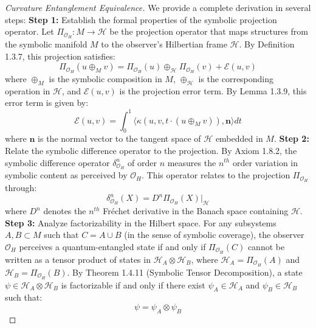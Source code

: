 \begin{proof}[Curvature Entanglement Equivalence]
\label{proof:bk8_curvature_entanglement_equivalence}
We provide a complete derivation in several steps:
\textbf{Step 1:} Establish the formal properties of the symbolic projection operator.
Let $\Pi_{\mathcal{O}_H}: M \to \mathcal{H}$ be the projection operator that maps structures from the symbolic manifold $M$ to the observer's Hilbertian frame $\mathcal{H}$. By Definition 1.3.7, this projection satisfies:
\begin{equation}
\Pi_{\mathcal{O}_H}(u \oplus_M v) = \Pi_{\mathcal{O}_H}(u) \oplus_{\mathcal{H}} \Pi_{\mathcal{O}_H}(v) + \mathcal{E}(u,v)
\end{equation}
where $\oplus_M$ is the symbolic composition in $M$, $\oplus_{\mathcal{H}}$ is the corresponding operation in $\mathcal{H}$, and $\mathcal{E}(u,v)$ is the projection error term. By Lemma 1.3.9, this error term is given by:
\begin{equation}
\mathcal{E}(u,v) = \int_{0}^{1} \langle \kappa(u,v,t\cdot(u \oplus_M v)), \mathbf{n} \rangle dt
\end{equation}
where $\mathbf{n}$ is the normal vector to the tangent space of $\mathcal{H}$ embedded in $M$.
\textbf{Step 2:} Relate the symbolic difference operator to the projection.
By Axiom 1.8.2, the symbolic difference operator $\delta^n_{\mathcal{O}_H}$ of order $n$ measures the $n^{th}$ order variation in symbolic content as perceived by $\mathcal{O}_H$. This operator relates to the projection $\Pi_{\mathcal{O}_H}$ through:
\begin{equation}
\delta^n_{\mathcal{O}_H}(X) = D^n\Pi_{\mathcal{O}_H}(X)|_{\mathcal{H}}
\end{equation}
where $D^n$ denotes the $n^{th}$ Fréchet derivative in the Banach space containing $\mathcal{H}$.
\textbf{Step 3:} Analyze factorizability in the Hilbert space.
For any subsystems $A, B \subset M$ such that $C = A \cup B$ (in the sense of symbolic coverage), the observer $\mathcal{O}_H$ perceives a quantum-entangled state if and only if $\Pi_{\mathcal{O}_H}(C)$ cannot be written as a tensor product of states in $\mathcal{H}_A \otimes \mathcal{H}_B$, where $\mathcal{H}_A = \Pi_{\mathcal{O}_H}(A)$ and $\mathcal{H}_B = \Pi_{\mathcal{O}_H}(B)$.
By Theorem 1.4.11 (Symbolic Tensor Decomposition), a state $\psi \in \mathcal{H}_A \otimes \mathcal{H}_B$ is factorizable if and only if there exist $\psi_A \in \mathcal{H}_A$ and $\psi_B \in \mathcal{H}_B$ such that:
\begin{equation}
\psi = \psi_A \otimes \psi_B

\end{equation}
\end{proof}
